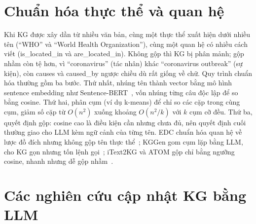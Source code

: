 \section{Chuẩn hóa thực thể và quan hệ}\label{sec:bg-canon}

Khi KG được xây dần từ nhiều văn bản, cùng một thực thể xuất hiện dưới nhiều tên (``WHO'' và ``World Health Organization''), cùng một quan hệ có nhiều cách viết (is\_located\_in và are\_located\_in).
Không gộp thì KG bị phân mảnh; gộp nhầm còn tệ hơn, vì ``coronavirus'' (tác nhân) khác ``coronavirus outbreak'' (sự kiện), còn causes và caused\_by ngược chiều dù rất giống về chữ.
Quy trình chuẩn hóa thường gồm ba bước.
Thứ nhất, nhúng tên thành vector bằng mô hình sentence embedding như Sentence-BERT~\cite{reimers2019sbert}, vốn nhúng từng câu độc lập để so bằng cosine.
Thứ hai, phân cụm (ví dụ k-means) để chỉ so các cặp trong cùng cụm, giảm số cặp từ $O(n^2)$ xuống khoảng $O(n^2/k)$ với $k$ cụm cỡ đều.
Thứ ba, quyết định gộp: cosine cao là điều kiện cần nhưng chưa đủ, nên quyết định cuối thường giao cho LLM kèm ngữ cảnh của từng tên.
EDC chuẩn hóa quan hệ về lược đồ đích nhưng không gộp tên thực thể~\cite{zhang2024edc}; KGGen gom cụm lặp bằng LLM, cho KG gọn nhưng tốn lệnh gọi~\cite{mo2025kggen}; iText2KG và ATOM gộp chỉ bằng ngưỡng cosine, nhanh nhưng dễ gộp nhầm~\cite{lairgi2024itext2kg,lairgi2025atom}.

\section{Các nghiên cứu cập nhật KG bằng LLM}\label{sec:bg-related}

